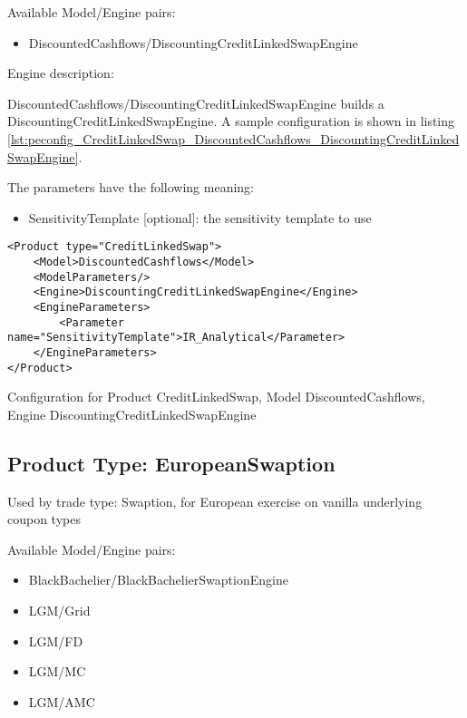 Available Model/Engine pairs:

\begin{itemize}
\item DiscountedCashflows/DiscountingCreditLinkedSwapEngine
\end{itemize}

Engine description:

DiscountedCashflows/DiscountingCreditLinkedSwapEngine builds a DiscountingCreditLinkedSwapEngine. A sample configuration is shown
in listing \ref{lst:peconfig_CreditLinkedSwap_DiscountedCashflows_DiscountingCreditLinkedSwapEngine}.

The parameters have the following meaning:

\begin{itemize}
\item SensitivityTemplate [optional]: the sensitivity template to use 
\end{itemize}

\begin{longlisting}
\begin{verbatim}
<Product type="CreditLinkedSwap">
    <Model>DiscountedCashflows</Model>
    <ModelParameters/>
    <Engine>DiscountingCreditLinkedSwapEngine</Engine>
    <EngineParameters>
        <Parameter name="SensitivityTemplate">IR_Analytical</Parameter>
    </EngineParameters>
</Product>
\end{verbatim}
\caption{Configuration for Product CreditLinkedSwap, Model DiscountedCashflows, Engine DiscountingCreditLinkedSwapEngine}
\label{lst:peconfig_CreditLinkedSwap_DiscountedCashflows_DiscountingCreditLinkedSwapEngine}
\end{longlisting}

\subsection{Product Type: EuropeanSwaption}

Used by trade type: Swaption, for European exercise on vanilla underlying coupon types

Available Model/Engine pairs:

\begin{itemize}
\item BlackBachelier/BlackBachelierSwaptionEngine
\item LGM/Grid
\item LGM/FD
\item LGM/MC
\item LGM/AMC
\end{itemize}

